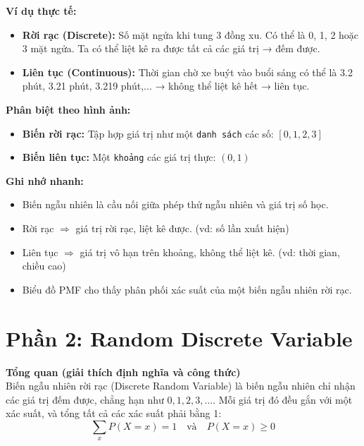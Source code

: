 \documentclass[11pt]{article}
\begin{document}
\textbf{Ví dụ thực tế:}
\begin{itemize}
    \item \textbf{Rời rạc (Discrete):} Số mặt ngửa khi tung 3 đồng xu. Có thể là 0, 1, 2 hoặc 3 mặt ngửa. Ta có thể liệt kê ra được tất cả các giá trị → đếm được.
    \item \textbf{Liên tục (Continuous):} Thời gian chờ xe buýt vào buổi sáng có thể là 3.2 phút, 3.21 phút, 3.219 phút,... → không thể liệt kê hết → liên tục.
\end{itemize}

\textbf{Phân biệt theo hình ảnh:}
\begin{itemize}
    \item \textbf{Biến rời rạc:} Tập hợp giá trị như một \texttt{danh sách} các số: $[0, 1, 2, 3]$
    \item \textbf{Biến liên tục:} Một \texttt{khoảng} các giá trị thực: $(0, 1)$
\end{itemize}

\vspace{1em}

\begin{summarybox}
    \textbf{Ghi nhớ nhanh:} 
    \begin{itemize}
        \item Biến ngẫu nhiên là cầu nối giữa phép thử ngẫu nhiên và giá trị số học.
        \item Rời rạc $\Rightarrow$ giá trị rời rạc, liệt kê được. (vd: số lần xuất hiện)
        \item Liên tục $\Rightarrow$ giá trị vô hạn trên khoảng, không thể liệt kê. (vd: thời gian, chiều cao)
        \item Biểu đồ PMF cho thấy phân phối xác suất của một biến ngẫu nhiên rời rạc.
    \end{itemize}
\end{summarybox}

\vspace{1em}

\section{Phần 2: Random Discrete Variable}

\textbf{Tổng quan (giải thích định nghĩa và công thức)} \\

Biến ngẫu nhiên rời rạc (Discrete Random Variable) là biến ngẫu nhiên chỉ nhận các giá trị đếm được, chẳng hạn như $0, 1, 2, 3, \dots$. Mỗi giá trị đó đều gắn với một xác suất, và tổng tất cả các xác suất phải bằng 1:
\[
\sum_x P(X = x) = 1 \quad \text{và} \quad P(X = x) \geq 0
\] \\ 
\end{document}

